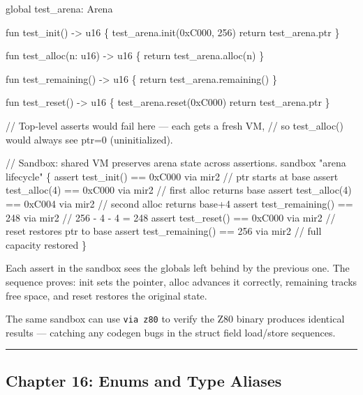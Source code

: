 \documentclass[
  11pt,
]{article}
\newenvironment{Shaded}{\begin{snugshade}}{\end{snugshade}}
\newcommand{\NormalTok}[1]{#1}
\begin{document}
\begin{Shaded}
\begin{Highlighting}[]
\NormalTok{global test\_arena: Arena}

\NormalTok{fun test\_init() {-}\textgreater{} u16 \{}
\NormalTok{    test\_arena.init(0xC000, 256)}
\NormalTok{    return test\_arena.ptr}
\NormalTok{\}}

\NormalTok{fun test\_alloc(n: u16) {-}\textgreater{} u16 \{}
\NormalTok{    return test\_arena.alloc(n)}
\NormalTok{\}}

\NormalTok{fun test\_remaining() {-}\textgreater{} u16 \{}
\NormalTok{    return test\_arena.remaining()}
\NormalTok{\}}

\NormalTok{fun test\_reset() {-}\textgreater{} u16 \{}
\NormalTok{    test\_arena.reset(0xC000)}
\NormalTok{    return test\_arena.ptr}
\NormalTok{\}}

\NormalTok{// Top{-}level asserts would fail here — each gets a fresh VM,}
\NormalTok{// so test\_alloc() would always see ptr=0 (uninitialized).}

\NormalTok{// Sandbox: shared VM preserves arena state across assertions.}
\NormalTok{sandbox "arena lifecycle" \{}
\NormalTok{    assert test\_init() == 0xC000 via mir2        // ptr starts at base}
\NormalTok{    assert test\_alloc(4) == 0xC000 via mir2      // first alloc returns base}
\NormalTok{    assert test\_alloc(4) == 0xC004 via mir2      // second alloc returns base+4}
\NormalTok{    assert test\_remaining() == 248 via mir2       // 256 {-} 4 {-} 4 = 248}
\NormalTok{    assert test\_reset() == 0xC000 via mir2       // reset restores ptr to base}
\NormalTok{    assert test\_remaining() == 256 via mir2       // full capacity restored}
\NormalTok{\}}
\end{Highlighting}
\end{Shaded}

Each assert in the sandbox sees the globals left behind by the previous
one. The sequence proves: init sets the pointer, alloc advances it
correctly, remaining tracks free space, and reset restores the original
state.

The same sandbox can use \texttt{via\ z80} to verify the Z80 binary
produces identical results --- catching any codegen bugs in the struct
field load/store sequences.

\begin{center}\rule{0.5\linewidth}{0.5pt}\end{center}

\hypertarget{chapter-16-enums-and-type-aliases}{%
\subsection{Chapter 16: Enums and Type
Aliases}\label{chapter-16-enums-and-type-aliases}}
\end{document}
